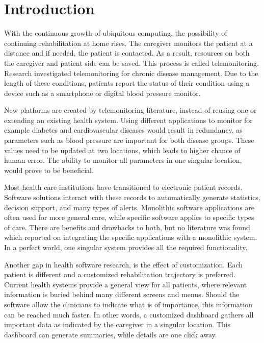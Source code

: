 \section{Introduction}

With the continuous growth of ubiquitous computing, the possibility of continuing rehabilitation at home rises. The caregiver monitors the patient at a distance and if needed, the patient is contacted. As a result, resources on both the caregiver and patient side can be saved. This process is called telemonitoring. Research investigated telemonitoring for chronic disease management. Due to the length of these conditions, patients report the status of their condition using a device such as a smartphone or digital blood pressure monitor.

New platforms are created by telemonitoring literature, instead of reusing one or extending an existing health system. Using different applications to monitor for example diabetes and cardiovascular diseases would result in redundancy, as parameters such as blood pressure are important for both disease groups. These values need to be updated at two locations, which leads to higher chance of human error. The ability to monitor all parameters in one singular location, would prove to be beneficial.

Most health care institutions have transitioned to electronic patient records. Software solutions interact with these records to automatically generate statistics, decision support, and many types of alerts. Monolithic software applications are often used for more general care, while specific software applies to specific types of care. There are benefits and drawbacks to both, but no literature was found which reported on integrating the specific applications with a monolithic system. In a perfect world, one singular system provides all the required functionality.

Another gap in health software research, is the effect of customization. Each patient is different and a customized rehabilitation trajectory is preferred. Current health systems provide a general view for all patients, where relevant information is buried behind many different screens and menus. Should the software allow the clinicians to indicate what is of importance, this information can be reached much faster. In other words, a customized dashboard gathers all important data as indicated by the caregiver in a singular location. This dashboard can generate summaries, while details are one click away. 

